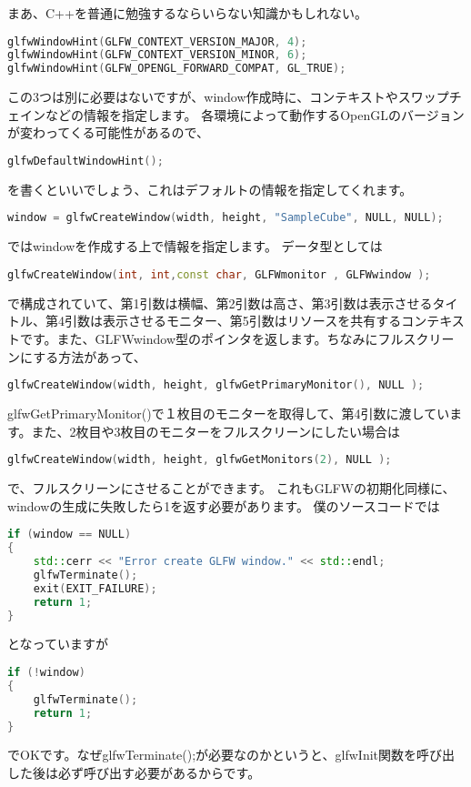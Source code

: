 \documentclass[a4paper,titlepage]{jsarticle}
\begin{document}
まあ、C++を普通に勉強するならいらない知識かもしれない。
\begin{lstlisting}[language=C++]
glfwWindowHint(GLFW_CONTEXT_VERSION_MAJOR, 4);
glfwWindowHint(GLFW_CONTEXT_VERSION_MINOR, 6);
glfwWindowHint(GLFW_OPENGL_FORWARD_COMPAT, GL_TRUE);
\end{lstlisting}
この3つは別に必要はないですが、window作成時に、コンテキストやスワップチェインなどの情報を指定します。
各環境によって動作するOpenGLのバージョンが変わってくる可能性があるので、
\begin{lstlisting}[language=C++]
glfwDefaultWindowHint();
\end{lstlisting}
を書くといいでしょう、これはデフォルトの情報を指定してくれます。
\begin{lstlisting}[language=C++]
window = glfwCreateWindow(width, height, "SampleCube", NULL, NULL);
\end{lstlisting}
ではwindowを作成する上で情報を指定します。
データ型としては
\begin{lstlisting}[language=C++]
glfwCreateWindow(int, int,const char, GLFWmonitor , GLFWwindow );
\end{lstlisting}
で構成されていて、第1引数は横幅、第2引数は高さ、第3引数は表示させるタイトル、第4引数は表示させるモニター、第5引数はリソースを共有するコンテキストです。また、GLFWwindow型のポインタを返します。ちなみにフルスクリーンにする方法があって、
\begin{lstlisting}[language=C++]
glfwCreateWindow(width, height, glfwGetPrimaryMonitor(), NULL );
\end{lstlisting}
glfwGetPrimaryMonitor()で１枚目のモニターを取得して、第4引数に渡しています。また、2枚目や3枚目のモニターをフルスクリーンにしたい場合は
\begin{lstlisting}[language=C++]
glfwCreateWindow(width, height, glfwGetMonitors(2), NULL );
\end{lstlisting}
で、フルスクリーンにさせることができます。
これもGLFWの初期化同様に、windowの生成に失敗したら1を返す必要があります。
僕のソースコードでは
\begin{lstlisting}[language=C++]
if (window == NULL)
{
	std::cerr << "Error create GLFW window." << std::endl;
	glfwTerminate();
	exit(EXIT_FAILURE);
	return 1;
}
\end{lstlisting}
となっていますが
\begin{lstlisting}[language=C++]
if (!window)
{
	glfwTerminate();
	return 1;
}
\end{lstlisting}
でOKです。なぜglfwTerminate();が必要なのかというと、glfwInit関数を呼び出した後は必ず呼び出す必要があるからです。
\end{document}
